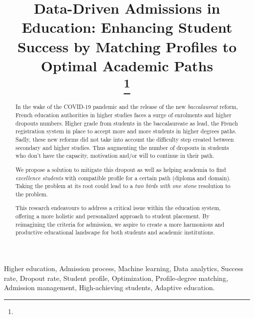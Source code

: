 \documentclass[conference]{IEEEtran}
\begin{document}
\title{Data-Driven Admissions in Education: Enhancing Student Success by Matching Profiles to Optimal Academic Paths\\
{\footnotesize \textsuperscript{}}
\thanks{}
}



\author{
}
\maketitle

\begin{abstract}
In the wake of the COVID-19 pandemic and the release of the new \textit{baccalaureat} reform, French education authorities in higher studies faces a surge of enrolments and higher dropouts numbers. Higher grade from students in the baccalaureate as lead, the French registration system in place to accept more and more students in higher degrees paths. Sadly, these new reforms did not take into account the difficulty step created between secondary and higher studies. Thus augmenting the number of dropouts in students who don't have the capacity, motivation and/or will to continue in their path. 

We propose a solution to mitigate this dropout as well as helping academia to find \textit{excellence students} with compatible profile for a certain path (diploma and domain). Taking the problem at its root could lead to a \textit{two birds with one stone} resolution to the problem.

This research endeavours to address a critical issue within the education system, offering a more holistic and personalized approach to student placement. By reimagining the criteria for admission, we aspire to create a more harmonious and productive educational landscape for both students and academic institutions. 
\end{abstract}
\vspace{8pt}
\begin{IEEEkeywords}
Higher education, Admission process, Machine learning, Data analytics, Success rate, Dropout rate, Student profile, Optimization, Profile-degree matching, Admission management, High-achieving students, Adaptive education.
\end{IEEEkeywords}
\vspace{16pt}
\end{document}
